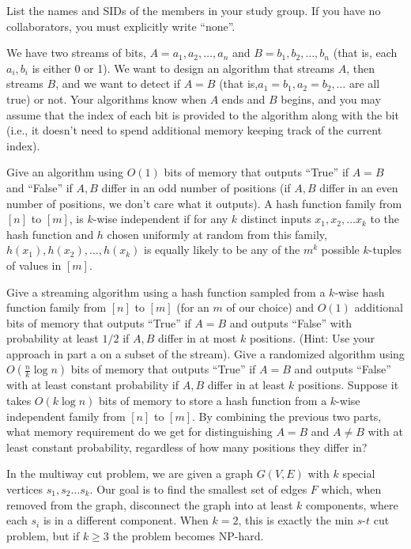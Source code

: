 \documentclass{article}
\begin{document}
List the names and SIDs of the members in your study group.
If you have no collaborators, you must explicitly write ``none''.


We have two streams of bits, $A = a_1, a_2, \ldots, a_n$ and $B = b_1, b_2, \ldots, b_n$ (that is, each $a_i, b_i$ is either 0 or 1). We want to design an algorithm that streams $A$, then streams $B$, and we want to detect if $A = B$ (that is,$a_1 = b_1, a_2 = b_2, \ldots$ are all true) or not. Your algorithms know when $A$ ends and $B$ begins, and you may assume that the index of each bit is provided to the algorithm along with the bit (i.e., it doesn't need to spend additional memory keeping track of the current index).

\begin{subparts}
\subpart Give an algorithm using $O(1)$ bits of memory that outputs ``True'' if $A = B$ and ``False'' if $A, B$ differ in an odd number of positions (if $A, B$ differ in an even number of positions, we don't care what it outputs). 
\subpart A hash function family from $[n]$ to $[m]$, is $k$-wise independent if for any $k$ distinct inputs $x_1, x_2, \ldots x_k$ to the hash function and $h$ chosen uniformly at random from this family, $h(x_1), h(x_2), \ldots, h(x_k)$ is equally likely to be any of the $m^k$ possible $k$-tuples of values in $[m]$.

Give a streaming algorithm using a hash function sampled from a $k$-wise hash function family from $[n]$ to $[m]$ (for an $m$ of our choice) and $O(1)$ additional bits of memory that outputs ``True'' if $A=B$ and outputs ``False'' with probability at least $1/2$ if $A, B$ differ in at most $k$ positions. (Hint: Use your approach in part a on a subset of the stream).
\subpart Give a randomized algorithm using $O(\frac{n}{k} \log n)$ bits of memory that outputs ``True'' if $A=B$ and outputs ``False'' with at least constant probability if $A, B$ differ in at least $k$ positions. 
\subpart Suppose it takes $O(k \log n)$ bits of memory to store a hash function from a $k$-wise independent family from $[n]$ to $[m]$. By combining the previous two parts, what memory requirement do we get for distinguishing $A = B$ and $A \neq B$ with at least constant probability, regardless of how many positions they differ in?
\end{subparts}

In the multiway cut problem, we are given a graph $G(V, E)$ with $k$ special vertices $s_1, s_2 \ldots s_k$. Our goal is to find the smallest set of edges $F$ which, when removed from the graph, disconnect the graph into at least $k$ components, where each $s_i$ is in a different component. When $k = 2$, this is exactly the min $s$-$t$ cut problem, but if $k \geq 3$ the problem becomes NP-hard.\\ 
\end{document}
